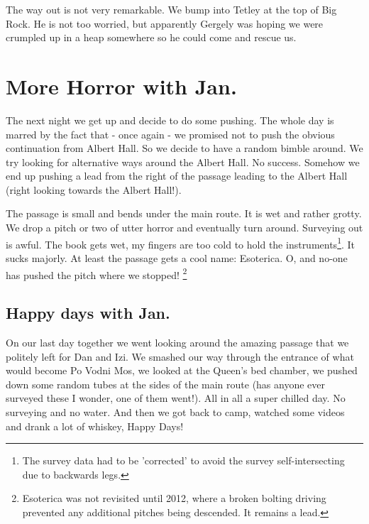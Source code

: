 The way out is not very remarkable. We bump into Tetley at the top of
Big Rock. He is not too worried, but apparently Gergely was hoping we
were crumpled up in a heap somewhere so he could come and rescue us.


\hypertarget{more-horror-with-jan.}{%
\section{More Horror with Jan.}\label{more-horror-with-jan.}}

The next night we get up and decide to do some pushing. The whole day is
marred by the fact that - once again - we promised not to push the
obvious continuation from Albert Hall. So we decide to have a random
bimble around. We try looking for alternative ways around the Albert
Hall. No success. Somehow we end up pushing a lead from the right of the
passage leading to the Albert Hall (right looking towards the Albert
Hall!).

The passage is small and bends under the main route. It is wet and
rather grotty. We drop a pitch or two of utter horror and eventually
turn around. Surveying out is awful. The book gets wet, my fingers are
too cold to hold the
instruments\footnote{The survey data had to be 'corrected' to avoid the survey self-intersecting due to backwards legs.}.
It sucks majorly. At least the passage gets a cool name: Esoterica. O,
and no-one has pushed the pitch where we stopped!
\footnote{Esoterica was not revisited until 2012, where a broken bolting driving prevented any additional pitches being descended. 
It remains a lead.}


\hypertarget{happy-days-with-jan.}{%
\subsection{Happy days with Jan.}\label{happy-days-with-jan.}}

On our last day together we went looking around the amazing passage that
we politely left for Dan and Izi. We smashed our way through the
entrance of what would become Po Vodni Mos, we looked at the Queen's bed
chamber, we pushed down some random tubes at the sides of the main route
(has anyone ever surveyed these I wonder, one of them went!). All in all
a super chilled day. No surveying and no water. And then we got back to
camp, watched some videos and drank a lot of whiskey, Happy Days!

